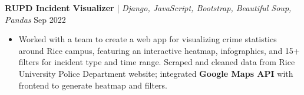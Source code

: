 \textbf{RUPD Incident Visualizer} | \textit{Django, JavaScript, Bootstrap, Beautiful Soup, Pandas} \hfill Sep 2022 \par
\begin{itemize}
	\item Worked with a team to create a web app for visualizing crime statistics around Rice campus, featuring an interactive heatmap, infographics, and 15+ filters for incident type and time range. Scraped and cleaned data from Rice University Police Department website; integrated \textbf{Google Maps API} with frontend to generate heatmap and filters.
\end{itemize}